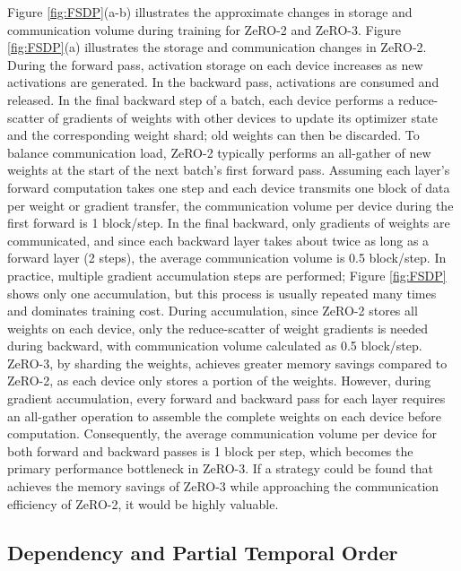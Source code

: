 \documentclass[letterpaper,twocolumn,10pt]{article}
\begin{document}
Figure \ref{fig:FSDP}(a-b) illustrates the approximate changes in storage and communication volume during training for ZeRO-2 and ZeRO-3. Figure \ref{fig:FSDP}(a) illustrates the storage and communication changes in ZeRO-2. During the forward pass, activation storage on each device increases as new activations are generated. In the backward pass, activations are consumed and released. In the final backward step of a batch, each device performs a reduce-scatter of gradients of weights with other devices to update its optimizer state and the corresponding weight shard; old weights can then be discarded. To balance communication load, ZeRO-2 typically performs an all-gather of new weights at the start of the next batch's first forward pass. Assuming each layer's forward computation takes one step and each device transmits one block of data per weight or gradient transfer, the communication volume per device during the first forward is 1 block/step. In the final backward, only gradients of weights are communicated, and since each backward layer takes about twice as long as a forward layer (2 steps), the average communication volume is 0.5 block/step. In practice, multiple gradient accumulation steps are performed; Figure \ref{fig:FSDP} shows only one accumulation, but this process is usually repeated many times and dominates training cost. During accumulation, since ZeRO-2 stores all weights on each device, only the reduce-scatter of weight gradients is needed during backward, with communication volume calculated as 0.5 block/step. ZeRO-3, by sharding the weights, achieves greater memory savings compared to ZeRO-2, as each device only stores a portion of the weights. However, during gradient accumulation, every forward and backward pass for each layer requires an all-gather operation to assemble the complete weights on each device before computation. Consequently, the average communication volume per device for both forward and backward passes is 1 block per step, which becomes the primary performance bottleneck in ZeRO-3. If a strategy could be found that achieves the memory savings of ZeRO-3 while approaching the communication efficiency of ZeRO-2, it would be highly valuable.

\subsection{Dependency and Partial Temporal Order}
\label{sec:dependency}
\end{document}
